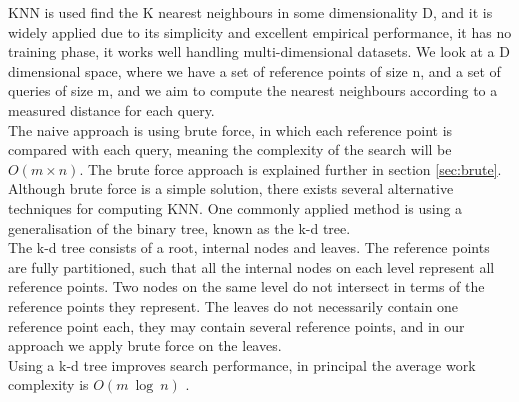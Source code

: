 KNN is used find the K nearest neighbours in some dimensionality D, and it is widely applied due to its simplicity and excellent empirical performance, it has no training phase, it works well handling multi-dimensional datasets. 
We look at a D dimensional space, where we have a set of reference points of size n, and a set of queries of size m, and we aim to compute the nearest neighbours according to a measured distance for each query. 
\\[2mm]
The naive approach is using brute force, in which each reference point is compared with each query, meaning the complexity of the search will be $O(m\times n)$. The brute force approach is explained further in section \ref{sec:brute}. Although brute force is a simple solution, there exists several alternative techniques for computing KNN. One commonly applied method is using a generalisation of the binary tree, known as the k-d tree. 
\\[2mm]
The k-d tree consists of a root, internal nodes and leaves. 
The reference points are fully partitioned, such that all the internal nodes on each level represent all reference points. Two nodes on the same level do not intersect in terms of the reference points they represent.
The leaves do not necessarily contain one reference point each, they may contain several reference points, and in our approach we apply brute force on the leaves.  
\\[2mm]
Using a k-d tree improves search performance, in principal the average work complexity is $O(m\ \log\ n)$ \cite{logmatches}. %

